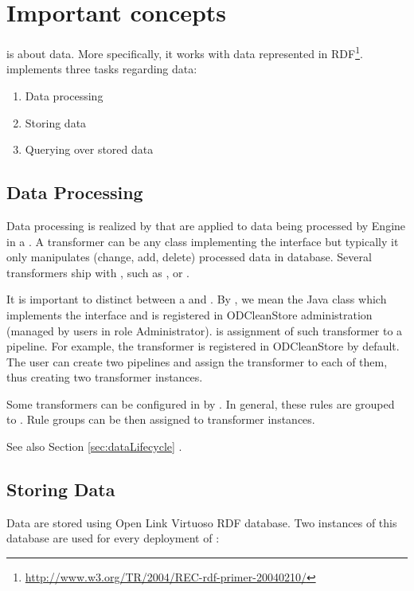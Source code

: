 \section{Important concepts}
\odcs is about data. More specifically, it works with data represented in RDF\footnote{\url{http://www.w3.org/TR/2004/REC-rdf-primer-20040210/}}. \odcs implements three tasks regarding data:

\begin{enumerate}
	\item Data processing
	\item Storing data
	\item Querying over stored data
\end{enumerate}

\subsection{Data Processing}
\label{sec:dataProcessing}
Data processing is realized by  that are applied to data being processed by Engine in a . A transformer can be any class implementing the  interface but typically it only manipulates (change, add, delete) processed data in database. Several transformers ship with \odcs, such as \QA, \OI or \DN.

It is important to distinct between a  and . By , we mean the Java class which implements the  interface and is registered in ODCleanStore administration (managed by users in role Administrator).  is assignment of such transformer to a pipeline. For example, the \QA transformer is registered in ODCleanStore by default. The user can create two pipelines and assign the \QA transformer to each of them, thus creating two transformer instances.

Some transformers can be configured in \FE by . In general, these rules are grouped to . Rule groups can be then assigned to transformer instances.

See also Section \ref{sec:dataLifecycle} .

\subsection{Storing Data}
Data are stored using Open Link Virtuoso RDF database. Two instances of this database are used for every deployment of \odcs:

